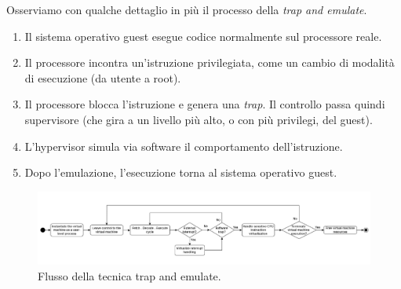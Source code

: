 Osserviamo con qualche dettaglio in più il processo della \textit{trap and emulate}.
\begin{enumerate}
    \item Il sistema operativo guest esegue codice normalmente sul processore reale.
    \item Il processore incontra un'istruzione privilegiata, come un cambio di modalità di esecuzione (da utente a root).
    \item Il processore blocca l’istruzione e genera una \textit{trap}. Il controllo passa quindi supervisore (che gira a un livello più alto, o con più privilegi, del guest).
    \item L’hypervisor simula via software il comportamento dell’istruzione.
    \item Dopo l’emulazione, l’esecuzione torna al sistema operativo guest.
\end{enumerate}

\begin{figure}[!h]
    \centering
    \includegraphics[width=1.1\linewidth]{img/trap-and-emulate.png}
    \caption{Flusso della tecnica trap and emulate.}
    \label{fig:trap-and-emulate}
\end{figure}

